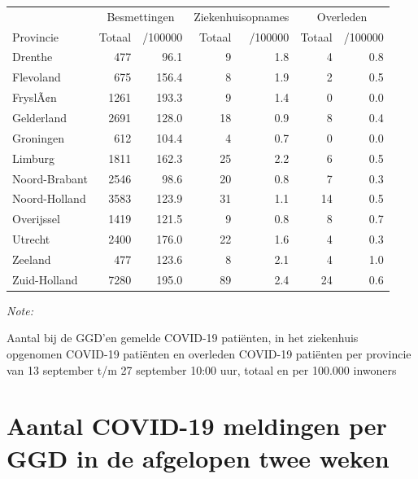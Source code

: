 \documentclass[
  english,
  man,floatsintext]{apa6}
\begin{document}
\begin{table}
\centering
\begin{threeparttable}
\begin{tabular}{lrrrrrr}
\toprule
\multicolumn{1}{c}{ } & \multicolumn{2}{c}{Besmettingen} & \multicolumn{2}{c}{Ziekenhuisopnames} & \multicolumn{2}{c}{Overleden} \\
\cmidrule(l{3pt}r{3pt}){2-3} \cmidrule(l{3pt}r{3pt}){4-5} \cmidrule(l{3pt}r{3pt}){6-7}
Provincie & Totaal & /100000 & Totaal & /100000 & Totaal & /100000\\
\midrule
Drenthe & 477 & 96.1 & 9 & 1.8 & 4 & 0.8\\
Flevoland & 675 & 156.4 & 8 & 1.9 & 2 & 0.5\\
FryslÃ¢n & 1261 & 193.3 & 9 & 1.4 & 0 & 0.0\\
Gelderland & 2691 & 128.0 & 18 & 0.9 & 8 & 0.4\\
Groningen & 612 & 104.4 & 4 & 0.7 & 0 & 0.0\\
Limburg & 1811 & 162.3 & 25 & 2.2 & 6 & 0.5\\
Noord-Brabant & 2546 & 98.6 & 20 & 0.8 & 7 & 0.3\\
Noord-Holland & 3583 & 123.9 & 31 & 1.1 & 14 & 0.5\\
Overijssel & 1419 & 121.5 & 9 & 0.8 & 8 & 0.7\\
Utrecht & 2400 & 176.0 & 22 & 1.6 & 4 & 0.3\\
Zeeland & 477 & 123.6 & 8 & 2.1 & 4 & 1.0\\
Zuid-Holland & 7280 & 195.0 & 89 & 2.4 & 24 & 0.6\\
\bottomrule
\end{tabular}
\begin{tablenotes}
\item \textit{Note: } 
\item Aantal bij de GGD’en gemelde COVID-19 patiënten, in het ziekenhuis opgenomen COVID-19 patiënten en overleden COVID-19 patiënten per provincie van 13 september t/m 27 september 10:00 uur, totaal en per 100.000 inwoners
\end{tablenotes}
\end{threeparttable}
\end{table}

\newpage

\hypertarget{aantal-covid-19-meldingen-per-ggd-in-de-afgelopen-twee-weken}{%
\section{Aantal COVID-19 meldingen per GGD in de afgelopen twee weken}\label{aantal-covid-19-meldingen-per-ggd-in-de-afgelopen-twee-weken}}
\end{document}
